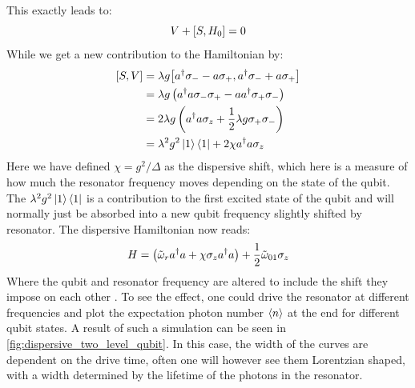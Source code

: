 This exactly leads to:
\begin{equation*}
    V + \comm{S}{H_0} = 0
\end{equation*}
While we get a new contribution to the Hamiltonian by:
\begin{align*}
    \comm{S}{V} &= \lambda g \comm{a^\dagger \sigma_- - a \sigma_+}{a^\dagger \sigma_- + a \sigma_+} \\
                &= \lambda g \left(a^\dagger a \sigma_- \sigma_+ - a a^\dagger \sigma_+ \sigma_-\right) \\
                &= 2 \lambda g \left(a^\dagger a \sigma_z + \frac12 \lambda g \sigma_+\sigma_-\right) \\
                &= \lambda^2 g^2 \ket{1}\bra{1} + 2 \chi a^\dagger a \sigma_z
\end{align*}
Here we have defined $\chi= g^2 / \Delta$ as the dispersive shift, which here is a measure of how much the resonator frequency moves depending on the state of the qubit. The $\lambda^2 g^2 \ket{1}\bra{1}$ is a contribution to the first excited state of the qubit and will normally just be absorbed into a new qubit frequency slightly shifted by resonator. The dispersive Hamiltonian now reads:
\begin{equation}\label{eq:dispersive_shift_tls}
    H = \left(\Tilde{\omega}_r a^\dagger a + \chi \sigma_z a^\dagger a \right)  + \frac12 \Tilde{\omega}_{01} \sigma_z
\end{equation}
Where the qubit and resonator frequency are altered to include the shift they impose on each other \cite{boissonneault_dispersive_2009}. To see the effect, one could drive the resonator at different frequencies and plot the expectation photon number $\expval{n}$ at the end for different qubit states. A result of such a simulation can be seen in \ref{fig:dispersive_two_level_qubit}. In this case, the width of the curves are dependent on the drive time, often one will however see them Lorentzian shaped, with a width determined by the lifetime of the photons in the resonator.

